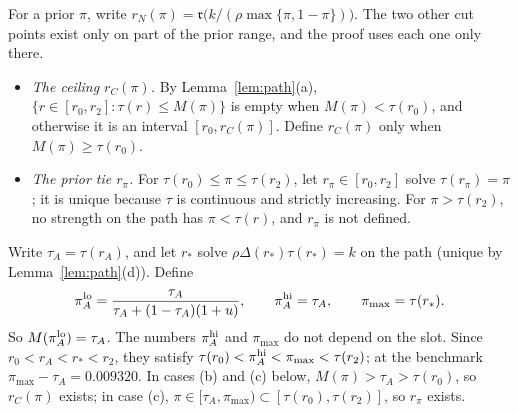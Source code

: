 \documentclass[11pt]{article}
\theoremstyle{definition}
\newcommand{\fr}{\mathfrak r}
\begin{document}
For a prior $\pi$, write $r_N(\pi)=\fr\big(k/(\rho\max\{\pi,1-\pi\})\big)$. The two other cut points exist only on
part of the prior range, and the proof uses each one only there.
\begin{itemize}
\item \emph{The ceiling $r_C(\pi)$.} By Lemma~\ref{lem:path}(a), $\{r\in[r_0,r_2]:\tau(r)\le M(\pi)\}$ is empty when
  $M(\pi)<\tau(r_0)$, and otherwise it is an interval $[r_0,r_C(\pi)]$. Define $r_C(\pi)$ only when
  $M(\pi)\ge\tau(r_0)$.
\item \emph{The prior tie $r_\pi$.} For $\tau(r_0)\le\pi\le\tau(r_2)$, let $r_\pi\in[r_0,r_2]$ solve
  $\tau(r_\pi)=\pi$; it is unique because $\tau$ is continuous and strictly increasing. For $\pi>\tau(r_2)$, no
  strength on the path has $\pi<\tau(r)$, and $r_\pi$ is not defined.
\end{itemize}
Write $\tau_A=\tau(r_A)$, and let $r_*$ solve $\rho\Delta(r_*)\tau(r_*)=k$ on the path (unique by
Lemma~\ref{lem:path}(d)). Define
\[
\pi_A^{\rm lo}=\frac{\tau_A}{\tau_A+(1-\tau_A)(1+u)},\qquad \pi_A^{\rm hi}=\tau_A,\qquad \pi_{\max}=\tau(r_*).
\]
So $M(\pi_A^{\rm lo})=\tau_A$. The numbers $\pi_A^{\rm hi}$ and $\pi_{\max}$ do not depend on the slot. Since
$r_0<r_A<r_*<r_2$, they satisfy $\tau(r_0)<\pi_A^{\rm hi}<\pi_{\max}<\tau(r_2)$; at the benchmark
$\pi_{\max}-\tau_A=0.009320$. In cases (b) and (c) below, $M(\pi)>\tau_A>\tau(r_0)$, so $r_C(\pi)$ exists; in
case (c), $\pi\in[\tau_A,\pi_{\max})\subset[\tau(r_0),\tau(r_2)]$, so $r_\pi$ exists.
\end{document}
